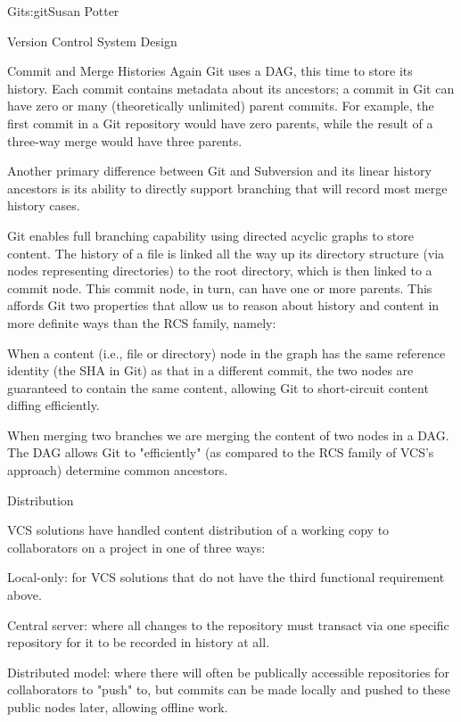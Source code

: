 \begin{aosachapter}{Git}{s:git}{Susan Potter}
\begin{aosasect1}{Version Control System Design}
\begin{aosasect2}{Commit and Merge Histories}
Again Git uses a DAG, this time to store its history. Each commit contains
metadata about its ancestors; a commit in Git can have zero or many
(theoretically unlimited) parent commits. For example, the first commit
in a Git repository would have zero parents, while the result of a three-way merge
would have three parents.

Another primary difference between Git and Subversion and its linear history
ancestors is its ability to directly support branching that will record
most merge history cases.


Git enables full branching capability using directed acyclic
graphs to store content. The history of a file is linked all the way
up its directory structure (via nodes representing directories) to the root
directory, which is then linked to a commit node. This commit node, in turn,
can have one or more parents. This affords Git two
properties that allow us to reason about history and content in
more definite ways than the RCS family, namely:
\begin{aosaitemize}
  \item When a content (i.e., file or directory) node in the graph has the same
  reference identity (the SHA in Git) as that in a different commit, the two
  nodes are guaranteed to contain the same content, allowing Git to
  short-circuit content diffing efficiently.
  \item When merging two branches we are merging the content of two nodes
  in a DAG. The DAG allows Git to "efficiently" (as compared to the
  RCS family of VCS's approach) determine common ancestors.
\end{aosaitemize}

\end{aosasect2}
\begin{aosasect2}{Distribution}

VCS solutions have handled content distribution of a working copy to collaborators on a
project in one of three ways:
\begin{aosaitemize}
  \item Local-only: for VCS solutions that do not have the
    third functional requirement above.
  \item Central server: where all changes to the repository must transact
    via one specific repository for it to be recorded in history at all.
  \item Distributed model: where there will often be publically accessible
    repositories for collaborators to "push" to, but commits can be made
    locally and pushed to these public nodes later, allowing offline work.
\end{aosaitemize}


\end{aosasect2}
\end{aosasect1}
\end{aosachapter}
